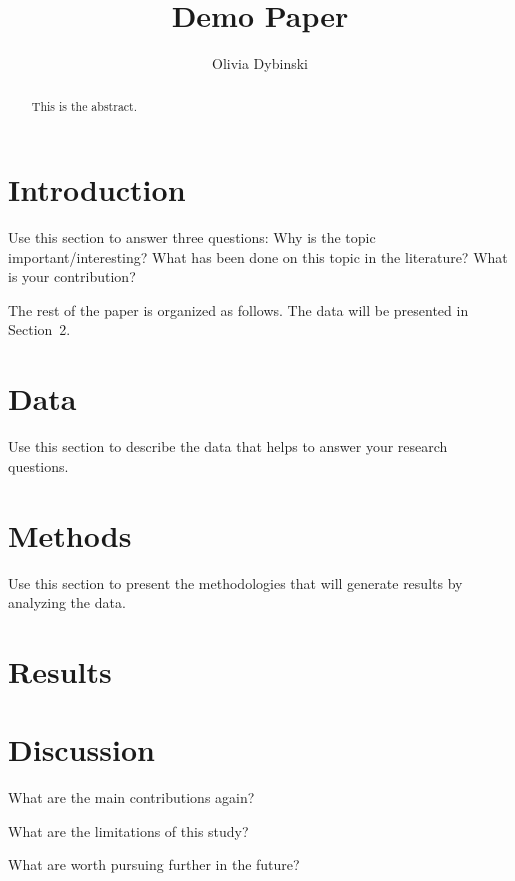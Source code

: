 \documentclass[12pt]{article}
\title{Demo Paper}
\author{Olivia Dybinski\\}
\begin{document}
 \maketitle

 \begin{abstract}
This is the abstract. 
 \end{abstract}


 \section{Introduction} 
 \label{sec:intro}

 Use this section to answer three questions:
 Why is the topic important/interesting?
 What has been done on this topic in the literature?
 What is your contribution?


 The rest of the paper is organized as follows.
 The data will be presented in Section~2.


 \section{Data}
 \label{sec:data}

 Use this section to describe the data that helps to answer your research questions.

 \section{Methods}
 \label{sec:meth}

 Use this section to present the methodologies that will generate results by analyzing the data.

 \section{Results}
 \label{sec:results}


 \section{Discussion}
 \label{sec:disc}

 What are the main contributions again?

 What are the limitations of this study?

 What are worth pursuing further in the future?


 
\end{document}
